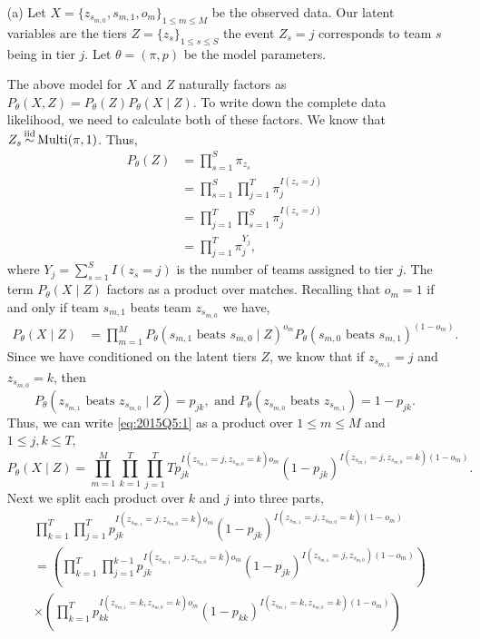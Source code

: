 \begin{enumerate}
	\item[(a)] Let $X = \{z_{s_{m,0}},s_{m,1},o_m\}_{1 \le m \le M}$ be the observed data. Our latent variables are the tiers $Z = \{z_s\}_{1 \le s \le S}$ the event $Z_s = j$ corresponds to team $s$ being in tier $j$. Let $\theta = (\pi,p)$ be the model parameters.
	
	The above model for $X$ and $Z$ naturally factors as $P_\theta(X,Z) = P_\theta(Z)P_\theta(X\mid Z)$. To write down the complete data likelihood, we need to calculate both of these factors. We know that $Z_s \simiid \mathrm{Multi}(\pi,1)$. Thus,
	\begin{align*}
		P_\theta(Z) &=\prod_{s=1}^S \pi_{z_s}\\
		&=\prod_{s=1}^S \prod_{j=1}^T \pi_j^{I(z_s=j)}\\
		&=\prod_{j=1}^T \prod_{s=1}^S \pi_j^{I(z_s=j)}\\
		&=\prod_{j=1}^T \pi_j^{Y_j},
	\end{align*}
	where $Y_j = \sum_{s=1}^S I(z_s=j)$ is the number of teams assigned to tier $j$. The term $P_\theta(X\mid Z)$ factors as a product over matches. Recalling that $o_m = 1$ if and only if team $s_{m,1}$ beats team $z_{s_{m,0}}$ we have,
	\begin{align}\label{eq:2015Q5:1}
		P_\theta(X \mid Z)&=\prod_{m=1}^M P_\theta(s_{m,1} \text{ beats } {s_{m,0}}\mid Z)^{o_m}P_\theta({s_{m,0}} \text{ beats } s_{m,1})^{(1-o_m)}.
	\end{align}
	Since we have conditioned on the latent tiers $Z$, we know that if $z_{s_{m,1}}=j$ and $z_{s_{m,0}} =k$, then 
	\[P_\theta(z_{s_{m,1}} \text{ beats } z_{s_{m,0}}\mid Z) = p_{jk}, \text{ and } P_\theta(z_{s_{m,0}} \text{ beats } z_{s_{m,1}}) = 1-p_{jk}. \]
	Thus, we can write \eqref{eq:2015Q5:1} as a product over $1 \le m \le M$ and $1 \le j,k\le T$,
	\[P_\theta(X \mid Z)=\prod_{m=1}^M \prod_{k=1}^T \prod_{j=1}^TTp_{jk}^{I(z_{s_{m,1}}=j,z_{s_{m,0}}=k)o_m}(1-p_{jk})^{I(z_{s_{m,1}}=j,z_{s_{m,0}}=k)(1-o_m)}. \]
	Next we split each product over $k$ and $j$ into three parts,
	\begin{align*}
		&\prod_{k=1}^T\prod_{j=1}^Tp_{jk}^{I(z_{s_{m,1}}=j,z_{s_{m,0}}=k)o_m}(1-p_{jk})^{I(z_{s_{m,1}}=j,z_{s_{m,0}}=k)(1-o_m)}\\
		&=\left(\prod_{k=1}^T\prod_{j=1}^{k-1}p_{jk}^{I(z_{s_{m,1}}=j,z_{s_{m,0}}=k)o_m}(1-p_{jk})^{I(z_{s_{m,1}}=j,z_{s_{m,0}})(1-o_m)}\right)\\
		&\times \left(\prod_{k=1}^T p_{kk}^{I(z_{s_{m,1}}=k,z_{s_{m,0}}=k)o_m}(1-p_{kk})^{I(z_{s_{m,1}}=k,z_{s_{m,0}}=k)(1-o_m)}\right) \\

\end{align*}
\end{enumerate}
